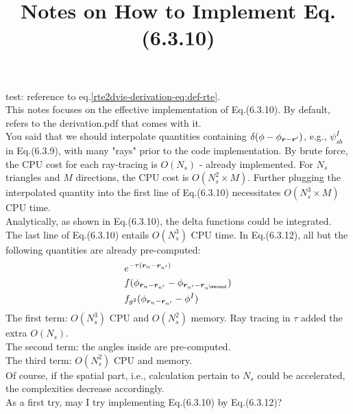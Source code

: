 \documentclass [8pt,letterpaper]{article}
\renewcommand{\vec}{\vectorsym}
\begin{document}
\title{Notes on How to Implement Eq.(6.3.10)}
\newpage
{}

test: reference to eq.\eqref{rte2dvis-derivation-eq:def-rte}.
\\
This notes focuses on the effective implementation of Eq.(6.3.10).
By default, refers to the derivation.pdf that comes with it.  
\\
You said that we should interpolate quantities containing
$\delta(\phi-\phi_{\vec{r}-\vec{r}^\prime})$,
e.g., $\psi_{sb}^I$ in Eq.(6.3.9),
with many "rays" prior to the code implementation.
By brute force, the CPU cost for each ray-tracing is $O(N_s)$ - already implemented.
For $N_s$ triangles and $M$ directions, the CPU cost is $O(N_s^2\times M)$.
Further plugging the interpolated quantity into the first line of Eq.(6.3.10) necessitates $O(N_s^3\times M)$ CPU time.
\\
Analytically, as shown in Eq.(6.3.10), the delta functions could be integrated.
The last line of Eq.(6.3.10) entails $O(N_s^3)$ CPU time.
In Eq.(6.3.12), all but the following quantities are already pre-computed:
\begin{align*}
	&
	e^{- \tau(\vec{r}_n-\vec{r}_{n^\prime})}
	\\
	&
	f(
	\phi_{\vec{r}_n-\vec{r}_{n^\prime}}
	-
	\phi_{\vec{r}_{n^\prime}-\vec{r}_{n^\second}}
	)
	\\
	&
	f_{g^2}(\phi_{\vec{r}_n-\vec{r}_{n^\prime}}-\phi^I)
\end{align*}
The first term: $O(N_s^3)$ CPU and $O(N_s^2)$ memory. Ray tracing in $\tau$ added the extra $O(N_s)$.
\\
The second term: the angles inside are pre-computed.
\\
The third term: $O(N_s^2)$ CPU and memory.
\\
Of course, if the spatial part, i.e., calculation pertain to $N_s$ could be accelerated, the complexities decrease accordingly.
\\
As a first try, may I try implementing Eq.(6.3.10) by Eq.(6.3.12)?
\end{document}
